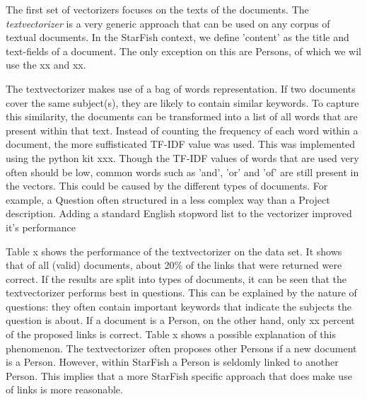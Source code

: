 The first set of vectorizers focuses on the texts of the documents. The \emph{textvectorizer} is a very generic approach that can be used on any corpus of textual documents. In the StarFish context, we define 'content' as the title and text-fields of a document. The only exception on this are Persons, of which we wil use the xx and xx. 

The textvectorizer makes use of a bag of words representation. If two documents cover the same subject(s), they are likely to contain similar keywords. To capture this similarity, the documents can be transformed into a list of all words that are present within that text. Instead of counting the frequency of each word within a document, the more suffisticated TF-IDF value was used. This was implemented using the python kit xxx. %
Though the TF-IDF values of words that are used very often should be low, common words such as 'and', 'or' and 'of' are still present in the vectors. This could be caused by the different types of documents. For example, a Question often structured in a less complex way than a Project description. Adding a standard English stopword list to the vectorizer improved it's performance %

Table x shows the performance of the textvectorizer on the data set. It shows that of all (valid) documents, about 20\% of the links that were returned were correct. If the results are split into types of documents, it can be seen that the textvectorizer performs best in questions. This can be explained by the nature of questions: they often contain important keywords that indicate the subjects the question is about. If a document is a Person, on the other hand, only xx percent of the proposed links is correct. Table x shows a possible explanation of this phenomenon. The textvectorizer often proposes other Persons if a new document is a Person. However, within StarFish a Person is seldomly linked to another Person. This implies that a more StarFish specific approach that does make use of links is more reasonable. 
